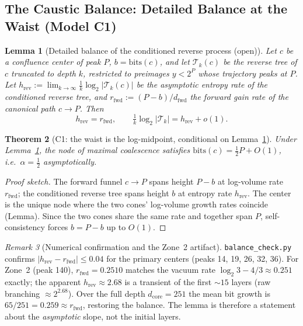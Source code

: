 \documentclass[12pt,a4paper]{article}
\newtheorem{theorem}{Theorem}[section]
\newtheorem{lemma}[theorem]{Lemma}
\theoremstyle{remark}
\newtheorem{remark}[theorem]{Remark}
\begin{document}
\subsection{The Caustic Balance: Detailed Balance at the Waist (Model C1)}
\begin{lemma}[Detailed balance of the conditioned reverse process (open)]
\label{lem:detail_balance}
Let $c$ be a confluence center of peak $P$, $b=\mathrm{bits}(c)$, and let
$\mathcal T_k(c)$ be the reverse tree of $c$ truncated to depth $k$, restricted to
preimages $y<2^P$ whose trajectory peaks at $P$. Let
$h_{\mathrm{rev}}:=\lim_{k\to\infty}\tfrac1k\log_2|\mathcal T_k(c)|$ be the asymptotic
entropy rate of the conditioned reverse tree, and
$r_{\mathrm{fwd}}:=(P-b)/d_{\mathrm{fwd}}$ the forward gain rate of the canonical path
$c\to P$. Then
\[
h_{\mathrm{rev}}=r_{\mathrm{fwd}},\qquad
\tfrac1k\log_2|\mathcal T_k|=h_{\mathrm{rev}}+o(1).
\]
\end{lemma}
\begin{theorem}[C1: the waist is the log-midpoint, conditional on
Lemma~\ref{lem:detail_balance}]
\label{thm:C1}
Under Lemma~\ref{lem:detail_balance}, the node of maximal coalescence satisfies
$\mathrm{bits}(c)=\tfrac12 P+O(1)$, i.e.\ $\alpha=\tfrac12$ asymptotically.
\end{theorem}
\begin{proof}[Proof sketch]
The forward funnel $c\to P$ spans height $P-b$ at log-volume rate $r_{\mathrm{fwd}}$;
the conditioned reverse tree spans height $b$ at entropy rate $h_{\mathrm{rev}}$. The
center is the unique node where the two cones' log-volume growth rates coincide
(Lemma). Since the two cones share the same rate and together span $P$, self-consistency
forces $b=P-b$ up to $O(1)$.
\end{proof}
\begin{remark}[Numerical confirmation and the Zone~2 artifact]
\texttt{balance\_check.py} confirms $|h_{\mathrm{rev}}-r_{\mathrm{fwd}}|\le0.04$ for the
primary centers (peaks 14, 19, 26, 32, 36). For Zone~2 (peak 140),
$r_{\mathrm{fwd}}=0.2510$ matches the vacuum rate $\log_2 3-4/3\approx0.251$ exactly; the
apparent $h_{\mathrm{rev}}\approx2.68$ is a transient of the first $\sim15$ layers (raw
branching $\approx2^{2.68}$). Over the full depth $d_{\mathrm{core}}=251$ the mean bit
growth is $65/251=0.259\approx r_{\mathrm{fwd}}$, restoring the balance. The lemma is
therefore a statement about the \emph{asymptotic} slope, not the initial layers.
\end{remark}
\end{document}
